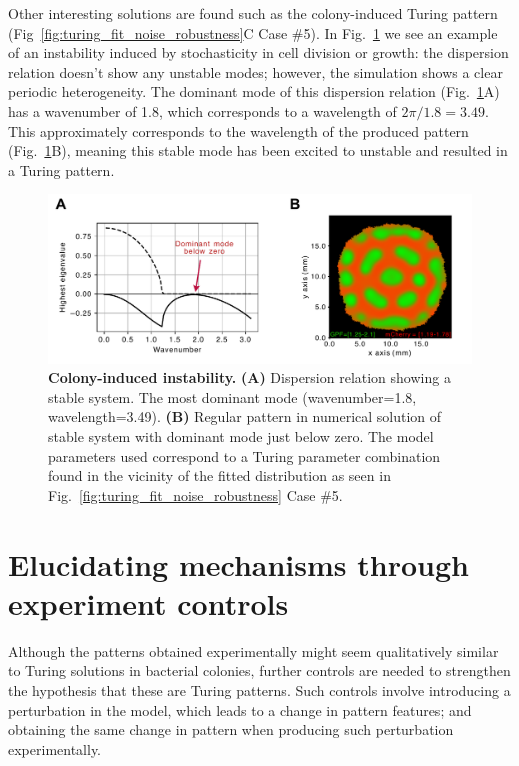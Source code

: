 Other interesting solutions are found such as the colony-induced Turing pattern (Fig~\ref{fig:turing_fit_noise_robustness}C Case \#5).
In Fig.~\ref{fig:colony_induced_turing} we see an example of an instability induced by stochasticity in cell division or growth: the dispersion relation doesn’t show any unstable modes; however, the simulation shows a clear periodic heterogeneity.
The dominant mode of this dispersion relation (Fig.~\ref{fig:colony_induced_turing}A) has a wavenumber of 1.8, which corresponds to a wavelength of $2\pi/1.8=3.49$.
This approximately corresponds to the wavelength of the produced pattern (Fig.~\ref{fig:colony_induced_turing}B), meaning this stable mode has been excited to unstable and resulted in a Turing pattern.


\begin{figure}[H] %
    \centering
    \begin{adjustbox}{center}
        \includegraphics[width=1\textwidth]{chapters/Chapter 3/colony_induced_turing} %
    \end{adjustbox}
    \caption{\textbf{Colony-induced instability.}  \textbf{(A)} Dispersion relation showing a stable system. The most dominant mode (wavenumber=1.8, wavelength=3.49). \textbf{(B)} Regular pattern in numerical solution of stable system with dominant mode just below zero. The model parameters used correspond to a Turing parameter combination found in the vicinity of the fitted distribution as seen in Fig.~\ref{fig:turing_fit_noise_robustness} Case \#5.}
    \label{fig:colony_induced_turing}
\end{figure}

\section{Elucidating mechanisms through experiment controls}
Although the patterns obtained experimentally might seem qualitatively similar to Turing solutions in bacterial colonies, further controls are needed to strengthen the hypothesis that these are Turing patterns.
Such controls involve introducing a perturbation in the model, which leads to a change in pattern features; and obtaining the same change in pattern when producing such perturbation experimentally.


